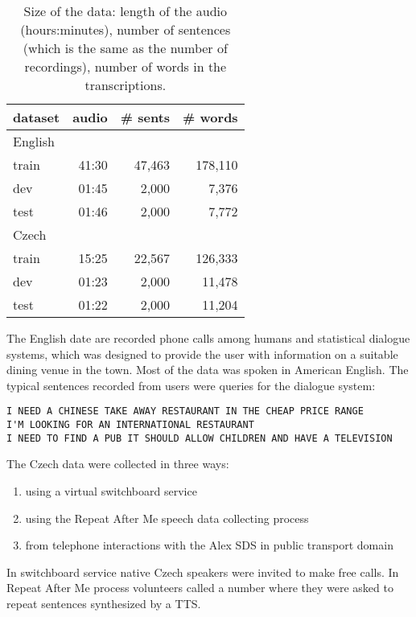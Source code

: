\begin{table}[hbp]
    \centering
    \begin{tabular}{lrrr}
        \hline
            dataset & audio & \# sents & \# words \\
        \hline
            English & & & \\
                train & 41:30 & 47,463 & 178,110 \\
                dev & 01:45 & 2,000 & 7,376 \\
                test & 01:46 & 2,000 & 7,772 \\
        \hline
            Czech & & & \\
                train & 15:25 & 22,567 & 126,333 \\
                dev & 01:23 & 2,000 & 11,478 \\
                test & 01:22 & 2,000 & 11,204 \\
        \hline
		\end{tabular}
    \caption{Size of the data: length of the audio (hours:minutes), number of sentences
        (which is the same as the number of recordings), number of words in the 
    transcriptions.\cite{korvas_2014}}
    \label{tab:audio}
\end{table}

The English date are recorded phone calls among humans and statistical dialogue systems,
which was designed to provide the user with information on a suitable dining venue in the town.
Most of the data was spoken in American English.
The typical sentences recorded from users were queries for the dialogue system:
\begin{verbatim}
I NEED A CHINESE TAKE AWAY RESTAURANT IN THE CHEAP PRICE RANGE
I'M LOOKING FOR AN INTERNATIONAL RESTAURANT
I NEED TO FIND A PUB IT SHOULD ALLOW CHILDREN AND HAVE A TELEVISION
\end{verbatim}

The Czech data were collected in three ways:
\begin{enumerate}
    \item using a virtual switchboard service
    \item using the Repeat After Me speech data collecting process
    \item from telephone interactions with the Alex \ac{SDS} in public transport domain
\end{enumerate}

In switchboard service native Czech speakers were invited to make free calls.
In Repeat After Me process volunteers called a number where they were asked to repeat 
sentences synthesized by a \ac{TTS}.

